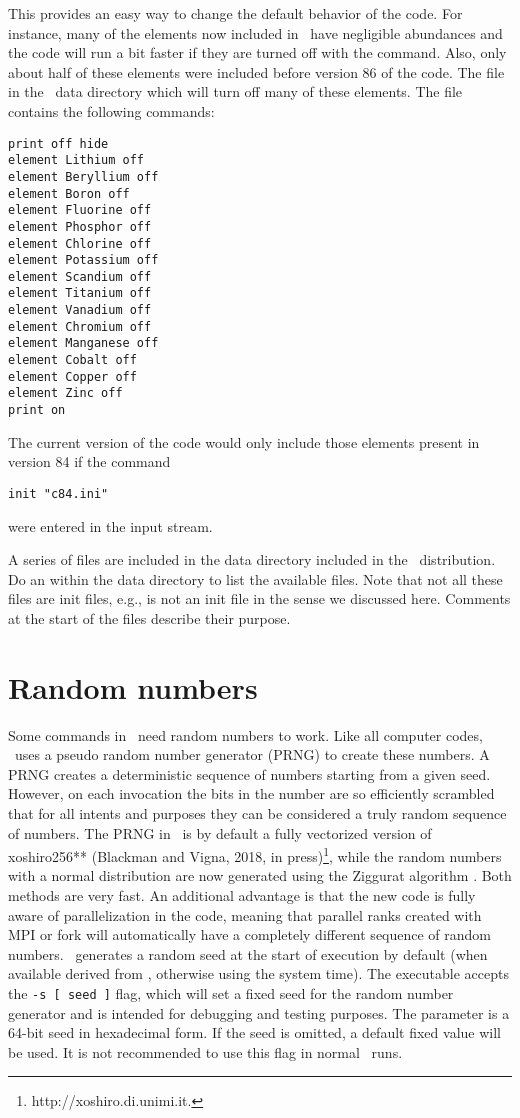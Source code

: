 This provides an easy way to change the default behavior of the code.
For instance, many of the elements now included in \Cloudy\ have
negligible abundances and the code will run a bit faster
if they are turned off with
the  command.
Also, only about half of these
elements were included before version 86 of the code.
The file  in the \Cloudy\ data directory
which will turn off many of these elements.
The  file contains
the following commands:
\begin{verbatim}
print off hide
element Lithium off
element Beryllium off
element Boron off
element Fluorine off
element Phosphor off
element Chlorine off
element Potassium off
element Scandium off
element Titanium off
element Vanadium off
element Chromium off
element Manganese off
element Cobalt off
element Copper off
element Zinc off
print on
\end{verbatim}

The current version of the code would only include those elements present
in version 84 if the command
\begin{verbatim}
init "c84.ini"
\end{verbatim}
were entered in the input stream.

A series of  files are included in the
data directory included in the \Cloudy\ distribution.
Do an  within the data directory
to list the available files. Note that not all these files
are init files, e.g.,  is not
an init file in the sense we discussed here.
Comments at the start of the files describe
their purpose.

\section{Random numbers}

Some commands in \Cloudy\ need random numbers to work. Like all computer
codes, \Cloudy\ uses a pseudo random number generator (PRNG) to create these
numbers. A PRNG creates a deterministic sequence of numbers starting from a
given seed. However, on each invocation the bits in the number are so
efficiently scrambled that for all intents and purposes they can be considered
a truly random sequence of numbers. The PRNG in \Cloudy\ is by default a fully
vectorized version of xoshiro256** (Blackman and Vigna, 2018, in
press)\footnote{http://xoshiro.di.unimi.it.}, while the random numbers with a
normal distribution are now generated using the Ziggurat algorithm
\citep{MarsagliaTsang00}. Both methods are very fast. An additional advantage
is that the new code is fully aware of parallelization in the code, meaning
that parallel ranks created with MPI or fork will automatically have a
completely different sequence of random numbers. \Cloudy\ generates a random
seed at the start of execution by default (when available derived from
, otherwise using the system time). The executable
accepts the {\tt -s~[~seed~]} flag, which will set a fixed seed for the random
number generator and is intended for debugging and testing purposes. The
parameter is a 64-bit seed in hexadecimal form. If the seed is omitted, a
default fixed value will be used. It is not recommended to use this flag in
normal \Cloudy\ runs.
